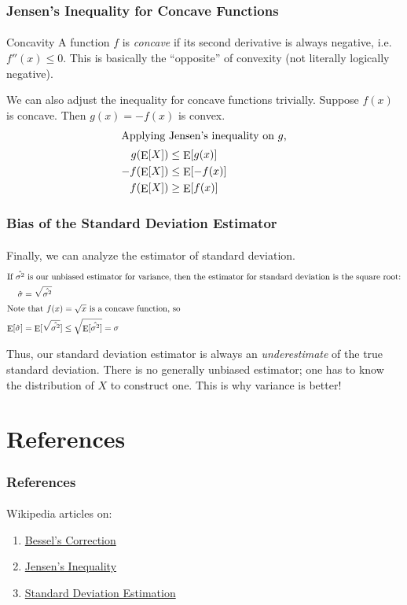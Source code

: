 \documentclass{beamer}                             %
\DeclareMathOperator{\E}{E}
\begin{document}
\begin{frame}
\frametitle{Jensen's Inequality for Concave Functions}
\framesubtitle{}
\begin{block}{Concavity}
A function \( f \) is \emph{concave} if its second derivative is
always negative, i.e. \( f''(x) \leq 0 \). This is basically the
\enquote{opposite} of convexity (not literally logically negative).
\end{block}

We can also adjust the inequality for concave functions trivially.
Suppose \( f(x) \) is concave. Then \( g(x) = -f(x) \) is convex.
\begin{align*}
  \shortintertext{Applying Jensen's inequality on \( g \),}
  g(\E[X]) &\leq \E[g(x)] \\
  -f(\E[X]) &\leq \E[-f(x)] \\
  f(\E[X]) &\geq \E[f(x)]
\end{align*}
\end{frame}

\begin{frame}
\frametitle{Bias of the Standard Deviation Estimator}
\framesubtitle{}
Finally, we can analyze the estimator of standard deviation.
\begin{align*} 
  \shortintertext{If \( \hat{\sigma^2} \) is our unbiased estimator for
    variance, then the estimator for standard deviation is the square root:}
  \hat{\sigma} &= \sqrt{\hat{\sigma^2}} \\
  \shortintertext{Note that \( f(x) = \sqrt{x} \) is a concave function, so}
  \E[\hat{\sigma}] &= \E[\sqrt{\hat{\sigma^2}}] \leq
    \sqrt{\E[\hat{\sigma^2}]} = \sigma
\end{align*}

Thus, our standard deviation estimator is always an \emph{underestimate}
of the true standard deviation. There is no generally unbiased estimator;
one has to know the distribution of \( X \) to construct one. This is why
variance is better!
\end{frame}

\section{References}

\begin{frame}
\frametitle{References}
\framesubtitle{}
Wikipedia articles on:
\begin{enumerate}
  \item \href{https://en.wikipedia.org/wiki/Bessel\%27s_correction}
      {Bessel's Correction}
  \item \href{https://en.wikipedia.org/wiki/Jensen\%27s_inequality}
      {Jensen's Inequality}
  \item \href{https://en.wikipedia.org/wiki/Unbiased_estimation_of_standard_deviation}
      {Standard Deviation Estimation}
\end{enumerate}
\end{frame}

\end{document}
